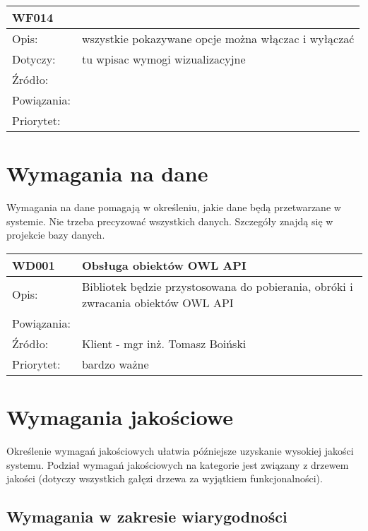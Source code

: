 \documentclass[a4paper,10pt]{article}
\begin{document}
\begin{tabular}{|p{3cm}|p{9cm}|} \hline

WF014 &  \\ \hline
Opis: &   wszystkie pokazywane opcje można włączac i wyłączać  \\ \hline
Dotyczy: & tu wpisac wymogi wizualizacyjne  \\ \hline
Źródło: &  \\ \hline
Powiązania: & \\ \hline
Priorytet: &  \\ \hline

\end{tabular}





\section{Wymagania na dane}

Wymagania na dane pomagają w określeniu, jakie dane będą przetwarzane w systemie. Nie trzeba precyzować wszystkich danych. Szczegóły znajdą się w projekcie bazy danych.


\begin{tabular}{|p{3cm}|p{9cm}|} \hline

WD001 & Obsługa obiektów OWL API \\ \hline
Opis: & Bibliotek będzie przystosowana do pobierania, obróki i zwracania obiektów OWL API \\ \hline
Powiązania: &  \\ \hline
Źródło: & Klient - mgr inż. Tomasz Boiński  \\ \hline
Priorytet: &  bardzo ważne \\ \hline

\end{tabular}


\section{Wymagania jakościowe}

Określenie wymagań jakościowych ułatwia późniejsze uzyskanie wysokiej jakości systemu. Podział wymagań jakościowych na kategorie jest związany z drzewem jakości (dotyczy wszystkich gałęzi drzewa za wyjątkiem funkcjonalności).

\subsection{Wymagania w zakresie wiarygodności}
\end{document}
